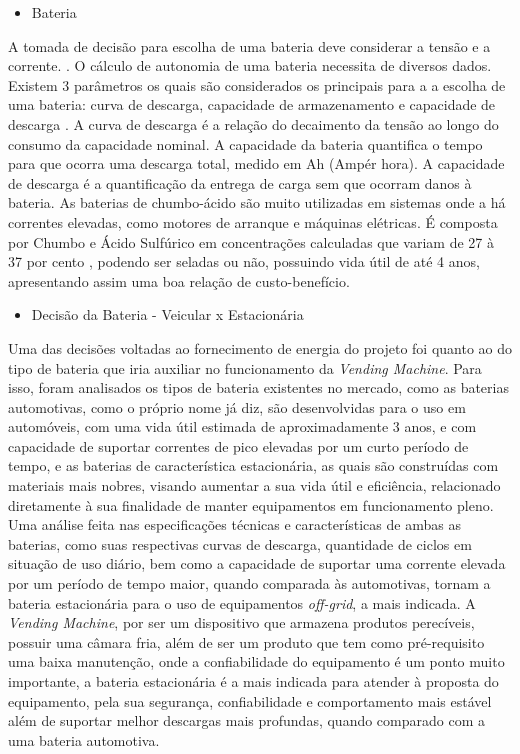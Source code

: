 \begin{itemize}
\item Bateria
\end{itemize}

      A tomada de decisão para escolha de uma bateria deve considerar a tensão e a corrente.  \cite{de2011}. O cálculo de autonomia de uma bateria necessita de diversos dados. Existem 3 parâmetros os quais são considerados os principais para a a escolha de uma bateria: curva de descarga, capacidade de armazenamento e capacidade de descarga \cite{meggiolaro2006tutorial}. A curva de descarga é a relação do decaimento da tensão ao longo do consumo da capacidade nominal. A capacidade da bateria quantifica o tempo para que ocorra uma descarga total, medido em Ah (Ampér hora). A capacidade de descarga é a quantificação da entrega de carga sem que ocorram danos à bateria.
      As baterias de chumbo-ácido são muito utilizadas em sistemas onde a há correntes  elevadas, como motores de arranque e máquinas elétricas. É composta por Chumbo e Ácido Sulfúrico em concentrações calculadas que variam de 27 à 37 por cento \cite{de2005estudo}, podendo ser seladas ou não, possuindo vida útil de até 4 anos, apresentando assim uma boa relação de custo-benefício.

\begin{itemize}
\item Decisão da Bateria - Veicular x Estacionária
\end{itemize}

		Uma das decisões voltadas ao fornecimento de energia do projeto foi quanto ao do tipo de bateria que iria auxiliar no funcionamento da \textit{Vending Machine}. Para isso, foram analisados os tipos de bateria existentes no mercado, como as baterias automotivas, como o próprio nome já diz, são desenvolvidas para o uso em automóveis, com uma vida útil estimada de aproximadamente 3 anos, e com capacidade de suportar correntes de pico elevadas por um curto período de tempo, e as baterias de característica estacionária, as quais são construídas com materiais mais nobres, visando aumentar a sua vida útil e eficiência, relacionado diretamente à sua finalidade de manter equipamentos em funcionamento pleno.
    	Uma análise feita nas especificações técnicas e características de ambas as baterias, como suas respectivas curvas de descarga, quantidade de ciclos em situação de uso diário, bem como a capacidade de suportar uma corrente elevada por um período de tempo maior, quando comparada às automotivas, tornam a bateria estacionária para o uso de equipamentos\textit{ off-grid}, a mais indicada.
   		A \textit{Vending Machine}, por ser um dispositivo que armazena produtos perecíveis, possuir uma câmara fria, além de ser um produto que tem como pré-requisito uma baixa manutenção, onde a confiabilidade do equipamento é um ponto muito importante, a bateria estacionária é a mais indicada para atender à proposta do equipamento, pela sua segurança, confiabilidade e comportamento mais estável além de suportar melhor descargas mais profundas, quando comparado com a uma bateria automotiva.

